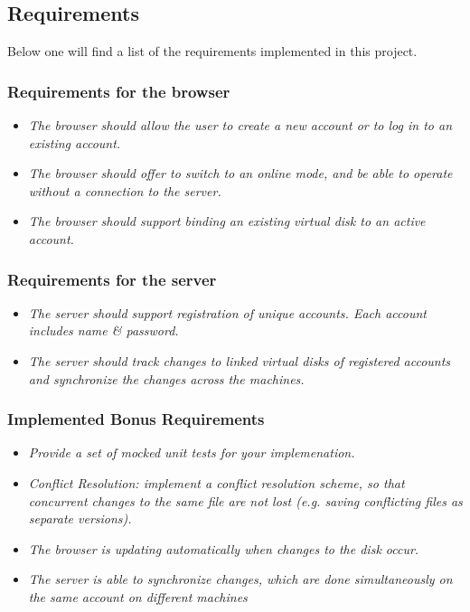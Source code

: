 \subsection{Requirements}
Below one will find a list of the requirements implemented in this project.

\subsubsection {Requirements for the browser}
\begin{itemize}
  \item \emph{The browser should allow the user to create a new account or to log in to an existing account.}
  \item \emph{The browser should offer to switch to an online mode, and be able
  to operate without a connection to the server. }
  \item \emph{The browser should support binding an existing virtual disk to an active account.}
\end{itemize}  


\subsubsection {Requirements for the server}
\begin{itemize}
  \item \emph{The server should support registration of unique accounts. Each
  account includes name \& password.}
  \item \emph{The server should track changes to linked virtual disks of registered accounts and synchronize the
changes across the machines.}
\end{itemize}  


\subsubsection {Implemented Bonus Requirements}
\begin{itemize}
  \item \emph{Provide a set of mocked unit tests for your implemenation.}

  \item \emph{Conflict Resolution: implement a conflict resolution scheme, so
  that concurrent changes to the same file are not lost (e.g. saving conflicting
  files as separate versions).}
  \item \emph{The browser is updating automatically when changes to the disk
  occur.}
  \item \emph{The server is able to synchronize changes, which are done
  simultaneously on the same account on different machines}
 
\end{itemize}

